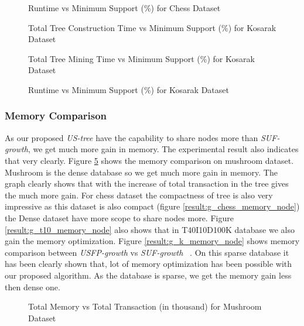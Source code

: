            \begin{figure}[h]
            \centering
                
            \caption{Runtime vs Minimum Support (\%) for Chess Dataset }
            \label{result:g_chess_total}
            \end{figure}
            \begin{figure}[h]
            \centering
                
            \caption{Total Tree Construction Time vs Minimum Support (\%) for Kosarak Dataset }
            \label{result:g_k_tree_construction_total}
            \end{figure}
            
            \begin{figure}[h]
            \centering
                
            \caption{Total Tree Mining Time vs Minimum Support (\%) for Kosarak Dataset }
            \label{result:g_k_mining_total}
            \end{figure}

            \begin{figure}[h]
            \centering
                
            \caption{Runtime vs Minimum Support (\%) for Kosarak Dataset }
            \label{result:g_k_total}
            \end{figure}
            
\clearpage
    \subsubsection{Memory Comparison}
        As our proposed \emph{US-tree} have the capability to share nodes more than \emph{SUF-growth}, we get much more gain in memory. The experimental result also indicates that very clearly. Figure \ref{result:g_m_memory_node} shows the memory comparison on mushroom dataset. Mushroom is the dense database so we get  much more gain in memory. The graph clearly shows that with the increase of total transaction in the tree gives the much more gain. For chess dataset the compactness of tree is also very impressive as this dataset is also compact (figure \ref{result:g_chess_memory_node}) the Dense dataset have more scope to share nodes more. Figure \ref{result:g_t10_memory_node} also shows that in T40I10D100K database we also gain the memory optimization. Figure \ref{result:g_k_memory_node} shows memory comparison between \emph{USFP-growth} vs \emph{SUF-growth} ~\cite{suf_growth}. On this sparse database it has been clearly shown that, lot of memory optimization has been possible with our proposed algorithm. As the database is sparse, we get the memory gain less then dense one.
            \begin{figure}[h]
            \centering
                
            \caption{Total Memory vs Total Transaction (in thousand) for Mushroom Dataset }
            \label{result:g_m_memory_node}
            \end{figure}
            
